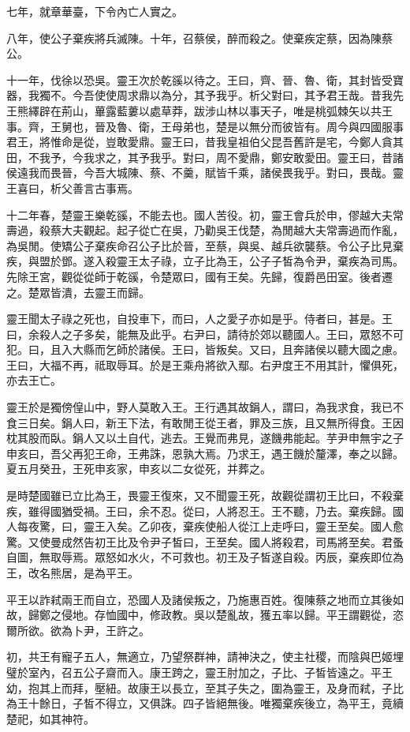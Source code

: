 七年，就章華臺，下令內亡人實之。

八年，使公子棄疾將兵滅陳。十年，召蔡侯，醉而殺之。使棄疾定蔡，因為陳蔡公。

十一年，伐徐以恐吳。靈王次於乾豀以待之。王曰，齊、晉、魯、衛，其封皆受寶器，我獨不。今吾使使周求鼎以為分，其予我乎。析父對曰，其予君王哉。昔我先王熊繹辟在荊山，蓽露藍蔞以處草莽，跋涉山林以事天子，唯是桃弧棘矢以共王事。齊，王舅也，晉及魯、衛，王母弟也，楚是以無分而彼皆有。周今與四國服事君王，將惟命是從，豈敢愛鼎。靈王曰，昔我皇祖伯父昆吾舊許是宅，今鄭人貪其田，不我予，今我求之，其予我乎。對曰，周不愛鼎，鄭安敢愛田。靈王曰，昔諸侯遠我而畏晉，今吾大城陳、蔡、不羹，賦皆千乘，諸侯畏我乎。對曰，畏哉。靈王喜曰，析父善言古事焉。

十二年春，楚靈王樂乾豀，不能去也。國人苦役。初，靈王會兵於申，僇越大夫常壽過，殺蔡大夫觀起。起子從亡在吳，乃勸吳王伐楚，為閒越大夫常壽過而作亂，為吳閒。使矯公子棄疾命召公子比於晉，至蔡，與吳、越兵欲襲蔡。令公子比見棄疾，與盟於鄧。遂入殺靈王太子祿，立子比為王，公子子皙為令尹，棄疾為司馬。先除王宮，觀從從師于乾豀，令楚眾曰，國有王矣。先歸，復爵邑田室。後者遷之。楚眾皆潰，去靈王而歸。

靈王聞太子祿之死也，自投車下，而曰，人之愛子亦如是乎。侍者曰，甚是。王曰，余殺人之子多矣，能無及此乎。右尹曰，請待於郊以聽國人。王曰，眾怒不可犯。曰，且入大縣而乞師於諸侯。王曰，皆叛矣。又曰，且奔諸侯以聽大國之慮。王曰，大福不再，祗取辱耳。於是王乘舟將欲入鄢。右尹度王不用其計，懼俱死，亦去王亡。

靈王於是獨傍偟山中，野人莫敢入王。王行遇其故鋗人，謂曰，為我求食，我已不食三日矣。鋗人曰，新王下法，有敢閒王從王者，罪及三族，且又無所得食。王因枕其股而臥。鋗人又以土自代，逃去。王覺而弗見，遂饑弗能起。芋尹申無宇之子申亥曰，吾父再犯王命，王弗誅，恩孰大焉。乃求王，遇王饑於釐澤，奉之以歸。夏五月癸丑，王死申亥家，申亥以二女從死，并葬之。

是時楚國雖已立比為王，畏靈王復來，又不聞靈王死，故觀從謂初王比曰，不殺棄疾，雖得國猶受禍。王曰，余不忍。從曰，人將忍王。王不聽，乃去。棄疾歸。國人每夜驚，曰，靈王入矣。乙卯夜，棄疾使船人從江上走呼曰，靈王至矣。國人愈驚。又使曼成然告初王比及令尹子皙曰，王至矣。國人將殺君，司馬將至矣。君蚤自圖，無取辱焉。眾怒如水火，不可救也。初王及子皙遂自殺。丙辰，棄疾即位為王，改名熊居，是為平王。

平王以詐弒兩王而自立，恐國人及諸侯叛之，乃施惠百姓。復陳蔡之地而立其後如故，歸鄭之侵地。存恤國中，修政教。吳以楚亂故，獲五率以歸。平王謂觀從，恣爾所欲。欲為卜尹，王許之。

初，共王有寵子五人，無適立，乃望祭群神，請神決之，使主社稷，而陰與巴姬埋璧於室內，召五公子齋而入。康王跨之，靈王肘加之，子比、子皙皆遠之。平王幼，抱其上而拜，壓紐。故康王以長立，至其子失之，圍為靈王，及身而弒，子比為王十餘日，子皙不得立，又俱誅。四子皆絕無後。唯獨棄疾後立，為平王，竟續楚祀，如其神符。

